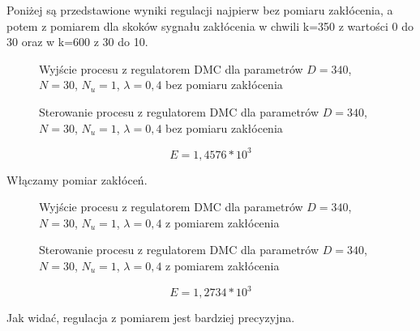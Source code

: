 Poniżej są przedstawione wyniki regulacji najpierw bez pomiaru zakłócenia, a potem z pomiarem dla skoków sygnału zakłócenia w chwili k=350 z wartości 0 do 30 oraz w k=600 z 30 do 10.

\begin{figure}[H]
\centering

\caption{Wyjście procesu z regulatorem DMC dla parametrów $D = 340$, $ N = 30$, $N_u = 1$,  $\lambda = 0,4$ bez pomiaru zakłócenia}
\end{figure}

\begin{figure}[H]
\centering

\caption{Sterowanie procesu z regulatorem DMC dla parametrów $D = 340$, $ N = 30$, $N_u = 1$,  $\lambda = 0,4$ bez pomiaru zakłócenia}
\end{figure}

\begin{equation}
E = 1,4576 * 10^3
\end{equation}

Włączamy pomiar zakłóceń.

\begin{figure}[H]
\centering

\caption{Wyjście procesu z regulatorem DMC dla parametrów $D = 340$, $ N = 30$, $N_u = 1$,  $\lambda = 0,4$ z pomiarem zakłócenia}
\end{figure}

\begin{figure}[H]
\centering

\caption{Sterowanie procesu z regulatorem DMC dla parametrów $D = 340$, $ N = 30$, $N_u = 1$,  $\lambda = 0,4$ z pomiarem zakłócenia}
\end{figure}

\begin{equation}
E = 1,2734 * 10^3
\end{equation}

Jak widać, regulacja z pomiarem jest bardziej precyzyjna.

